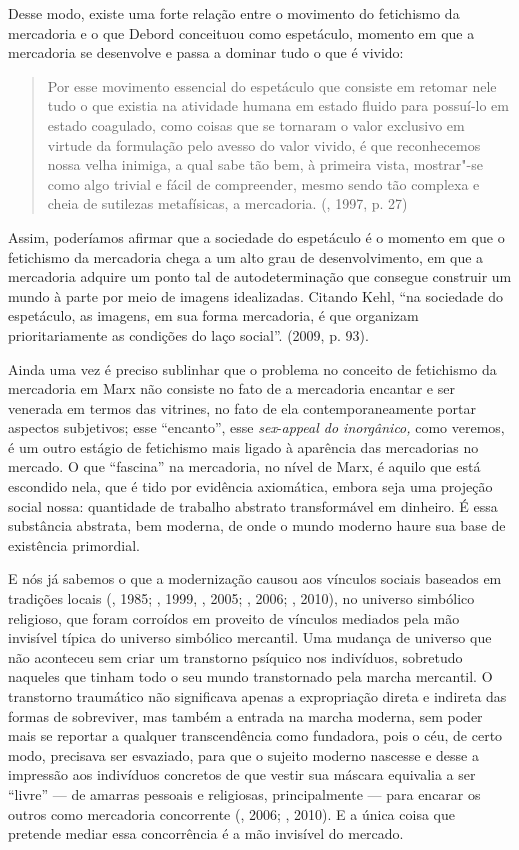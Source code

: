 {Desse modo, existe uma forte relação entre o movimento do fetichismo da
mercadoria e o que Debord conceituou como espetáculo, momento em que a
mercadoria se desenvolve e passa a dominar tudo o que é vivido:

\begin{quote}
Por esse movimento essencial do espetáculo que consiste em retomar nele
tudo o que existia na atividade humana em estado fluido para possuí-lo
em estado coagulado, como coisas que se tornaram o valor exclusivo em
virtude da formulação pelo avesso do valor vivido, é que reconhecemos
nossa velha inimiga, a qual sabe tão bem, à primeira vista, mostrar"-se
como algo trivial e fácil de compreender, mesmo sendo tão complexa e
cheia de sutilezas metafísicas, a mercadoria. (, 1997, p. 27)
\end{quote}

Assim, poderíamos afirmar que a sociedade do espetáculo é o momento em
que o fetichismo da mercadoria chega a um alto grau de desenvolvimento,
em que a mercadoria adquire um ponto tal de autodeterminação que
consegue construir um mundo à parte por meio de imagens idealizadas.
Citando Kehl, ``na sociedade do espetáculo, as imagens, em sua forma
mercadoria, é que organizam prioritariamente as condições do laço
social''. (2009, p. 93).

Ainda uma vez é preciso sublinhar que o problema no conceito de
fetichismo da mercadoria em Marx não consiste no fato de a mercadoria
encantar e ser venerada em termos das vitrines, no fato de ela
contemporaneamente portar aspectos subjetivos; esse ``encanto'', esse
\emph{sex}-\emph{appeal do inorgânico,} como veremos, é um outro estágio
de fetichismo mais ligado à aparência das mercadorias no mercado. O que
``fascina'' na mercadoria, no nível de Marx, é aquilo que está escondido
nela, que é tido por evidência axiomática, embora seja uma projeção
social nossa: quantidade de trabalho abstrato transformável em dinheiro.
É essa substância abstrata, bem moderna, de onde o mundo moderno haure
sua base de existência primordial.

E nós já sabemos o que a modernização causou aos vínculos sociais
baseados em tradições locais (, 1985; , 1999, , 2005;
, 2006; , 2010), no universo simbólico religioso, que foram
corroídos em proveito de vínculos mediados pela mão invisível típica do
universo simbólico mercantil. Uma mudança de universo que não aconteceu
sem criar um transtorno psíquico nos indivíduos, sobretudo naqueles que
tinham todo o seu mundo transtornado pela marcha mercantil. O transtorno
traumático não significava apenas a expropriação direta e indireta das
formas de sobreviver, mas também a entrada na marcha moderna, sem poder
mais se reportar a qualquer transcendência como fundadora, pois o céu,
de certo modo, precisava ser esvaziado, para que o sujeito moderno
nascesse e desse a impressão aos indivíduos concretos de que vestir sua
máscara equivalia a ser ``livre'' --- de amarras pessoais e religiosas,
principalmente --- para encarar os outros como mercadoria concorrente
(, 2006; , 2010). E a única coisa que pretende mediar essa
concorrência é a mão invisível do mercado.

}
